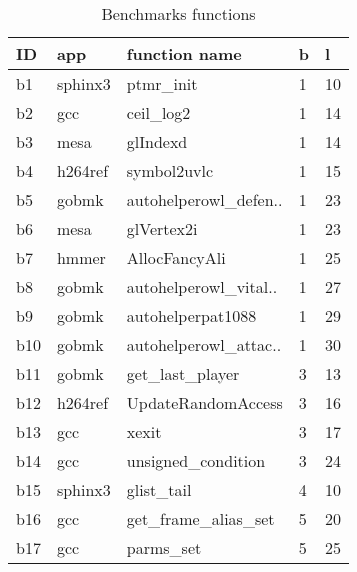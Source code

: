 \begin{longtable}{|l|l|l|l|l|}
\caption{\label{tab:benchmarks}{Benchmarks functions}}\\
\hline
{ID}&{app}&{function name}&{b}&{l}\\
\hline
b1&sphinx3&ptmr\_init&1&10
\\
b2&gcc&ceil\_log2&1&14
\\
b3&mesa&glIndexd&1&14
\\
b4&h264ref&symbol2uvlc&1&15
\\
b5&gobmk&autohelperowl\_defen..&1&23
\\
b6&mesa&glVertex2i&1&23
\\
b7&hmmer&AllocFancyAli&1&25
\\
b8&gobmk&autohelperowl\_vital..&1&27
\\
b9&gobmk&autohelperpat1088&1&29
\\
b10&gobmk&autohelperowl\_attac..&1&30
\\
b11&gobmk&get\_last\_player&3&13
\\
b12&h264ref&UpdateRandomAccess&3&16
\\
b13&gcc&xexit&3&17
\\
b14&gcc&unsigned\_condition&3&24
\\
b15&sphinx3&glist\_tail&4&10
\\
b16&gcc&get\_frame\_alias\_set&5&20
\\
b17&gcc&parms\_set&5&25
\\
\hline
\end{longtable}
